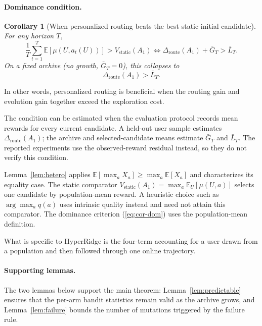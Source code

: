 \documentclass{article} %
\newtheorem{corollary}[theorem]{Corollary}
\providecommand{\E}{\mathbb{E}}
\renewcommand{\eqref}[1]{\textup{(\ref{#1})}}
\begin{document}
\paragraph{Dominance condition.}

\label{sec:method-cor-dom}

\begin{corollary}[When personalized routing beats the best static initial candidate]
\label{cor:dominance}
For any horizon $T$,
\begin{equation}
\label{eq:cor-dom}
\frac{1}{T}\sum_{t=1}^T \E[\mu(U, a_t(U))] > V_{\mathrm{static}}(A_1)
\iff
\Delta_{\mathrm{route}}(A_1) + \bar G_T > \bar L_T.
\end{equation}
On a fixed archive (no growth, $\bar G_T = 0$), this collapses to
\begin{equation}
\label{eq:cor-dom-fixed}
\Delta_{\mathrm{route}}(A_1) > \bar L_T.
\end{equation}
\end{corollary}

In other words, personalized routing is beneficial when the routing gain and evolution gain together exceed the exploration cost.

The condition can be estimated when the evaluation protocol records mean
rewards for every current candidate. A held-out user sample estimates
\(\Delta_{\mathrm{route}}(A_1)\); the archive and selected-candidate means
estimate \(\bar G_T\) and \(\bar L_T\). The reported experiments use the
observed-reward residual instead, so they do not verify this condition.

Lemma~\ref{lem:hetero} applies $\E[\max_a X_a]\ge\max_a\E[X_a]$ and characterizes its equality case. The static comparator $V_{\mathrm{static}}(A_1)=\max_a\E_U[\mu(U,a)]$ selects one candidate by population-mean reward. A heuristic choice such as $\arg\max_a q(a)$ uses intrinsic quality instead and need not attain this comparator. The dominance criterion \eqref{eq:cor-dom} uses the population-mean definition.

What is specific to HyperRidge is the four-term accounting for a user drawn
from a population and then followed through one online trajectory.

\paragraph{Supporting lemmas.}

\label{sec:method-supporting}

The two lemmas below support the main theorem: Lemma~\ref{lem:predictable} ensures that the per-arm bandit statistics remain valid as the archive grows, and Lemma~\ref{lem:failure} bounds the number of mutations triggered by the failure rule.
\end{document}
